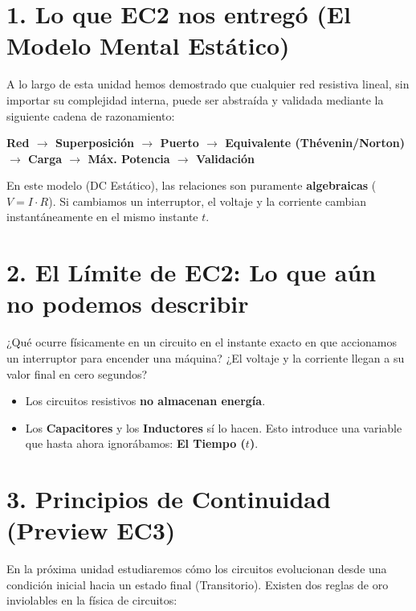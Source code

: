 \documentclass[11pt, a4paper]{article}
\begin{document}
\begin{tcolorbox}[colback=ucbblue!5!white, colframe=ucbblue, title=\textbf{Síntesis de Circuitos DC (EC2) y el Puente hacia Transitorios (EC3)}]
\end{tcolorbox}

\section*{1. Lo que EC2 nos entregó (El Modelo Mental Estático)}
A lo largo de esta unidad hemos demostrado que cualquier red resistiva lineal, sin importar su complejidad interna, puede ser abstraída y validada mediante la siguiente cadena de razonamiento:
\begin{center}
    \textbf{Red $\rightarrow$ Superposición $\rightarrow$ Puerto $\rightarrow$ Equivalente (Thévenin/Norton) $\rightarrow$ Carga $\rightarrow$ Máx. Potencia $\rightarrow$ Validación}
\end{center}
En este modelo (DC Estático), las relaciones son puramente \textbf{algebraicas} ($V = I \cdot R$). Si cambiamos un interruptor, el voltaje y la corriente cambian instantáneamente en el mismo instante $t$.

\section*{2. El Límite de EC2: Lo que aún no podemos describir}
¿Qué ocurre físicamente en un circuito en el instante exacto en que accionamos un interruptor para encender una máquina? ¿El voltaje y la corriente llegan a su valor final en cero segundos?
\begin{itemize}
    \item Los circuitos resistivos \textbf{no almacenan energía}.
    \item Los \textbf{Capacitores} y los \textbf{Inductores} sí lo hacen. Esto introduce una variable que hasta ahora ignorábamos: \textbf{El Tiempo ($t$)}.
\end{itemize}

\section*{3. Principios de Continuidad (Preview EC3)}
En la próxima unidad estudiaremos cómo los circuitos evolucionan desde una condición inicial hacia un estado final (Transitorio). Existen dos reglas de oro inviolables en la física de circuitos:
\end{document}
